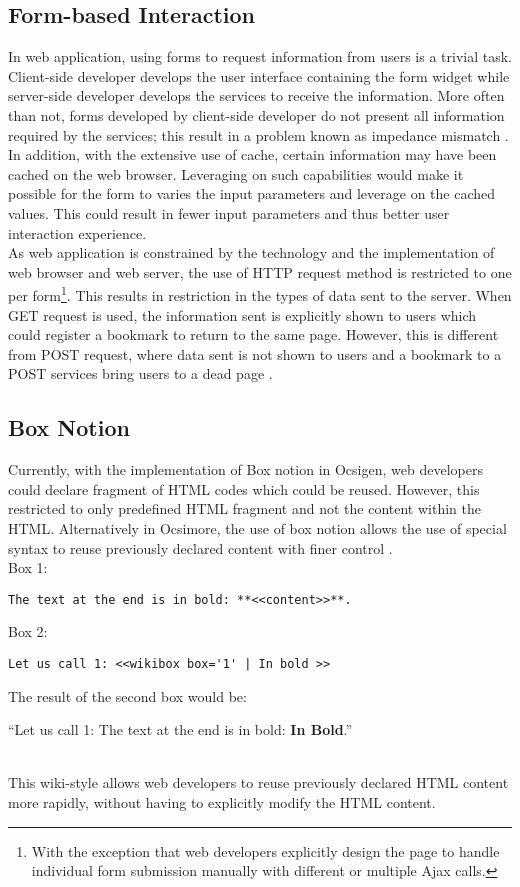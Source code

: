 \documentclass[12pt,fullpage]{article}
\begin{document}
\subsection{Form-based Interaction}
In web application, using forms to request information from users is a trivial
task. Client-side developer develops the user interface containing the form widget
while server-side developer develops the services to receive the information.
More often than not, forms developed by client-side developer do not present
all information required by the services; this result in a problem known as
impedance mismatch \parencite{links06}.
\\
In addition, with the extensive use of cache, certain information may have
been cached on the web browser. Leveraging on such capabilities would make it
possible for the form to varies the input parameters and leverage on the cached
values. This could result in fewer input parameters and thus better
user interaction experience.
\\
As web application is constrained by the technology and the implementation of web
browser and web server, the use of HTTP request method is restricted to one per
form\footnote{With the exception that web developers explicitly design the
page to handle individual form submission manually with different or multiple
Ajax calls.}. This results in restriction in the types of data sent to the server.
When GET request is used, the information sent is explicitly shown to users which could
register a bookmark to return to the same page. However, this is different from POST
request, where data sent is not shown to users and a bookmark to a POST
services bring users to a dead page \parencite{balat06}.

\subsection{Box Notion}
Currently, with the implementation of Box notion in Ocsigen, web developers
could declare fragment of HTML codes which could be reused. However, this restricted
to only predefined HTML fragment and not the content within the HTML. Alternatively in
Ocsimore, the use of box notion allows the use of special syntax to reuse
previously declared content with finer control \parencite{balat09}.
\\ Box 1:
\begin{verbatim}
The text at the end is in bold: **<<content>>**.
\end{verbatim}
Box 2:
\begin{verbatim}
Let us call 1: <<wikibox box='1' | In bold >>
\end{verbatim}
The result of the second box would be:
\\
\centerline{``Let us call 1: The text at the end is in bold: {\bf In Bold}.''}
\\
This wiki-style allows web developers to reuse previously declared HTML
content more rapidly, without having to explicitly modify the HTML content.
\end{document}
